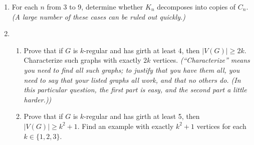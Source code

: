 \documentclass[11pt]{amsart}
\begin{document}
\begin{enumerate}

\item For each $n$ from 3 to 9, determine whether $K_n$ decomposes into copies of $C_n$.  \textit{(A large number of these cases can be ruled out quickly.)}

\item
\begin{enumerate}
\item Prove that if $G$ is $k$-regular and has girth at least 4, then $|V(G)|\geq 2k$.  Characterize such graphs with exactly $2k$ vertices.  \textit{(``Characterize'' means you need to find all such graphs; to justify that you have them all, you need to say that your listed graphs all work, and that no others do.  (In this particular question, the first part is easy, and the second part a little harder.))}

\item Prove that if $G$ is $k$-regular and has girth at least 5, then $|V(G)|\geq k^2+1$.  Find an example with exactly $k^2+1$ vertices for each $k\in\{1,2,3\}$.
\end{enumerate}


\end{enumerate}
\end{document}
